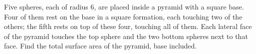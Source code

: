 Five spheres, each of radius $6$, are placed inside a pyramid with a square base. Four of them rest on the base in a square formation, each touching two of the others; the fifth rests on top of these four, touching all of them. Each lateral face of the pyramid touches the top sphere and the two bottom spheres next to that face. Find the total surface area of the pyramid, base included.
